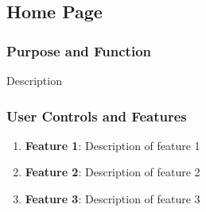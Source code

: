 
\newpage
\subsection{Home Page}
\subsubsection{Purpose and Function}
Description



\subsubsection{User Controls and Features}
\begin{enumerate}
    \item \textbf{Feature 1}: Description of feature 1
    \item \textbf{Feature 2}: Description of feature 2
    \item \textbf{Feature 3}: Description of feature 3
\end{enumerate}

